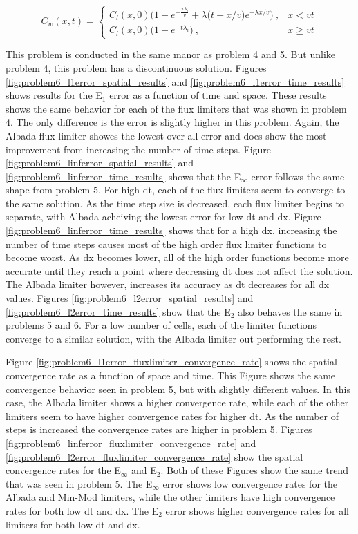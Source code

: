 \begin{equation}
C_{w} (x,t) = \begin{cases}
  C_{l} (x, 0) \Big( 1 - e^{-\frac{x \lambda _i}{v}} + \lambda \big(t - x/v\big)e^{-\lambda x/v} \Big)\ , & x < vt \\
  C_{l} (x, 0) \Big( 1 - e^{-t \lambda _i}\Big)\ , & x \ge vt
\end{cases}
\end{equation}

This problem is conducted in the same manor as problem 4 and 5. But unlike problem 4, this problem has a discontinuous solution. Figures \ref{fig:problem6_l1error_spatial_results} and  \ref{fig:problem6_l1error_time_results} shows results for the E${}_{1}$ error as a function of time and space. These results shows the same behavior for each of the flux limiters that was shown in problem 4. The only difference is the error is slightly higher in this problem. Again, the Albada flux limiter showes the lowest over all error and does show the most improvement from increasing the number of time steps. Figure \ref{fig:problem6_linferror_spatial_results} and \ref{fig:problem6_linferror_time_results} shows that the E${}_{\infty}$ error follows the same shape from problem 5. For high dt, each of the flux limiters seem to converge to the same solution. As the time step size is decreased, each flux limiter begins to separate, with Albada acheiving the lowest error for low dt and dx. Figure \ref{fig:problem6_linferror_time_results} shows that for a high dx, increasing the number of time steps causes most of the high order flux limiter functions to become worst. As dx becomes lower, all of the high order functions become more accurate until they reach a point where decreasing dt does not affect the solution. The Albada limiter however, increases its accuracy as dt decreases for all dx values. Figures \ref{fig:problem6_l2error_spatial_results} and \ref{fig:problem6_l2error_time_results} show that the E${}_{2}$ also behaves the same in problems 5 and 6. For a low number of cells, each of the limiter functions converge to a similar solution, with the Albada limiter out performing the rest. 

Figure \ref{fig:problem6_l1error_fluxlimiter_convergence_rate} shows the spatial convergence rate as a function of space and time. This Figure shows the same convergence behavior seen in problem 5, but with slightly different values. In this case, the Albada limiter shows a higher convergence rate, while each of the other limiters seem to have higher convergence rates for higher dt. As the number of steps is increased the convergence rates are higher in problem 5. Figures \ref{fig:problem6_linferror_fluxlimiter_convergence_rate} and \ref{fig:problem6_l2error_fluxlimiter_convergence_rate} show the spatial convergence rates for the E${}_{\infty}$ and E${}_{2}$. Both of these Figures show the same trend that was seen in problem 5. The E${}_{\infty}$ error shows low convergence rates for the Albada and Min-Mod limiters, while the other limiters have high convergence rates for both low dt and dx. The E${}_{2}$ error shows higher convergence rates for all limiters for both low dt and dx. 

